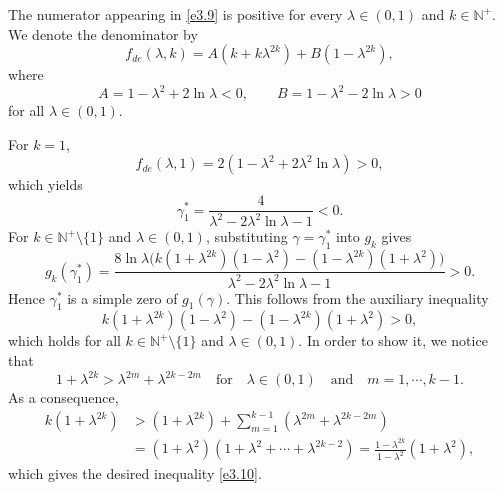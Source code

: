 \documentclass[reqno]{amsart}
\numberwithin{equation}{section}
\numberwithin{equation}{section}
\numberwithin{equation}{section}
\begin{document}
The numerator appearing in \eqref{e3.9} is positive for every \(\lambda \in (0,1)\) and \(k \in \mathbb{N}^+\). We denote the denominator by
\[
f_{de}(\lambda,k) = A(k + k\lambda^{2k}) + B(1 - \lambda^{2k}),
\]
where
\[
A = 1 - \lambda^2 + 2\ln\lambda < 0, \qquad B = 1 - \lambda^2 - 2\ln\lambda > 0
\]
for all \(\lambda \in (0,1)\).

For \(k=1\),
\[
f_{de}(\lambda,1) = 2(1 - \lambda^2 + 2\lambda^2 \ln\lambda) > 0,
\]
which yields
\[
\gamma_1^* = \frac{4}{\lambda^2 - 2\lambda^2 \ln\lambda - 1} < 0.
\]
For \(k \in \mathbb{N}^+ \setminus \{1\}\) and \(\lambda \in (0,1)\), substituting \(\gamma = \gamma_1^*\) into \(g_k\) gives
\[
g_k(\gamma_1^*) = \frac{8\ln\lambda \bigl( k(1 + \lambda^{2k})(1 - \lambda^2) - (1 - \lambda^{2k})(1 + \lambda^2) \bigr)}{\lambda^2 - 2\lambda^2 \ln\lambda - 1} > 0.
\]
Hence \(\gamma_1^*\) is a simple zero of \(g_1(\gamma)\). This follows from the auxiliary inequality
\begin{equation}
\label{e3.10}
k(1 + \lambda^{2k})(1 - \lambda^2) - (1 - \lambda^{2k})(1 + \lambda^2) > 0,
\end{equation}
which holds for all \(k \in \mathbb{N}^+ \setminus \{1\}\) and \(\lambda \in (0,1)\). In order to show it, we notice that
$$1+\lambda^{2k}> \lambda^{2m}+\lambda^{2k-2m}\quad\mathrm{for}\quad\lambda\in(0,1)\quad\mathrm{and}\quad m=1,\cdots,k-1.$$
As a consequence,
\begin{align*}
k(1+\lambda^{2k})&>(1+\lambda^{2k})+\sum_{m=1}^{k-1}(\lambda^{2m}+\lambda^{2k-2m})\\
&=(1+\lambda^2)(1+\lambda^{2}+\cdots+\lambda^{2k-2})=\frac{1-\lambda^{2k}}{1-\lambda^2}(1+\lambda^2),
\end{align*}
which gives the desired inequality \eqref{e3.10}.
\end{document}
